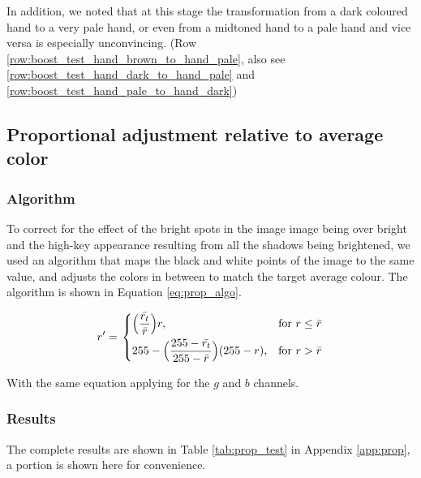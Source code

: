 \documentclass[12pt, a4paper]{article}
\newcommand*\mean[1]{\bar{#1}}
\begin{document}
In addition, we noted that at this stage the transformation from a dark coloured hand to a very pale hand, or even from a midtoned hand to a pale hand and vice versa is especially unconvincing. (Row \ref{row:boost_test_hand_brown_to_hand_pale}, also see \ref{row:boost_test_hand_dark_to_hand_pale} and \ref{row:boost_test_hand_pale_to_hand_dark})

\subsection{Proportional adjustment relative to average color}
\subsubsection*{Algorithm}
To correct for the effect of the bright spots in the image image being over bright and the high-key appearance resulting from all the shadows being brightened, we used an algorithm that maps the black and white points of the image to the same value, and adjusts the colors in between to match the target average colour. The algorithm is shown in Equation \ref{eq:prop_algo}.

\begin{equation} \label{eq:prop_algo}
  r' = \left.
  \begin{dcases}
    \displaystyle \Big(\frac{\mean{r_t}}{\mean{r}}\Big)r, & \text{for } r \leq \mean{r} \\
    \displaystyle 255 - 
    \Big(\frac{255 - \mean{r_t}}{255 - \mean{r}}\Big)(255 - r), & \text{for } r > \mean{r} \\
  \end{dcases}
  \right.
\end{equation}

With the same equation applying for the $g$ and $b$ channels.

\subsubsection*{Results}
The complete results are shown in Table \ref{tab:prop_test} in Appendix \ref{app:prop}, a portion is shown here for convenience.
\end{document}
